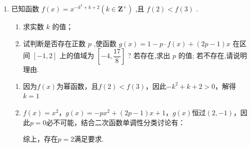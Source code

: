 \begin{enumerate}
\begin{jieda}
    \end{jieda}
    \item 已知函数 $f\left( x\right)  = {x}^{-{k}^{2} + k + 2}\left( {k \in  \mathbf{Z^+}}\right)$ ,且 $f\left( 2\right)  < f\left( 3\right)$ .
    \begin{enumerate}
        \item 求实数 $k$ 的值；
        \item 试判断是否存在正数 $p$ ,使函数 $g\left( x\right)  = 1 - p \cdot  f\left( x\right)  + \left( {{2p} - 1}\right) x$ 在区间 $\left\lbrack  {-1,2}\right\rbrack$ 上的值域为 $\left\lbrack  {-4,\dfrac{17}{8}}\right\rbrack$ ? 若存在,求出 $p$ 的值; 若不存在,请说明理由.
    \end{enumerate}
    \begin{jieda}
        \begin{enumerate}
            \item 因为$f(x)$为幂函数，且$f\left( 2\right)  < f\left( 3\right)$，因此$-{k}^{2} + k + 2 > 0$，解得$k = 1$
            \item $f(x) = x^2$，$g(x) = -px^2+(2p-1)x+1$，$g(x)$恒过$(2, -1)$，因此$p = 0$必不可能，结合二次函数单调性分类讨论有：
            综上，存在$p = 2$满足要求.
        \end{enumerate}
    \end{jieda}
\end{enumerate}
